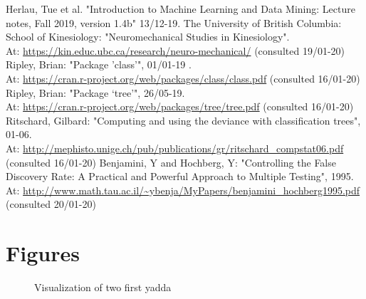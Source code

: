 \documentclass[11pt,fleqn]{article}
\begin{document}
\begin{thebibliography}{9}
	 Herlau, Tue et al. "Introduction to Machine Learning and Data Mining: Lecture notes, Fall 2019, version 1.4b" 13/12-19.
		 The University of British Columbia: School of Kinesiology:
	"Neuromechanical Studies in Kinesiology". \\
	At:
	\url{https://kin.educ.ubc.ca/research/neuro-mechanical/} (consulted 19/01-20)
	 Ripley, Brian: "Package ’class’", 01/01-19 .\\
	At:
	\url{https://cran.r-project.org/web/packages/class/class.pdf} (consulted 16/01-20)
	 Ripley, Brian: "Package ‘tree’", 26/05-19.\\ At: \url{https://cran.r-project.org/web/packages/tree/tree.pdf} (consulted 16/01-20)
	 Ritschard, Gilbard: "Computing and using the deviance with classification trees", 01-06.\\
	 At:
	\url{http://mephisto.unige.ch/pub/publications/gr/ritschard_compstat06.pdf} (consulted 16/01-20)
	 Benjamini, Y and Hochberg, Y: "Controlling the False Discovery Rate: A Practical and Powerful Approach to Multiple Testing", 1995.\\ At:
	\url{http://www.math.tau.ac.il/~ybenja/MyPapers/benjamini_hochberg1995.pdf} (consulted 20/01-20)

\end{thebibliography}
\appendix
\section{Figures}
\begin{figure}[H]
	
	\centering
	\caption{Visualization of two first yadda}
	\label{fig:2dtrajects}
\end{figure}
\end{document}
